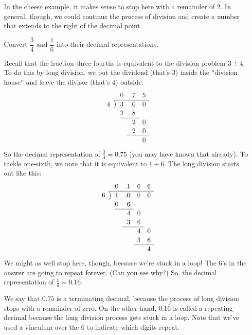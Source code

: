 In the cheese example, it makes sense to stop here with a remainder of 2. In general, though, we could continue the process of division and create a number that extends to the right of the decimal point.

\begin{boxedex}
Convert $\dfrac{3}{4}$ and $\dfrac{1}{6}$ into their decimal representations.

\bigskip{} Recall that the fraction three-fourths is equivalent to the division problem $3 \div 4$. To do this by long division, we put the dividend (that's 3) inside the ``division house'' and leave the divisor (that's 4) outside.
\[
\renewcommand\arraystretch{1.1}
\begin{array}{*1r @{\hskip\arraycolsep}c@{\hskip\arraycolsep} *3r}
	&&			0& .7	& 5 \\
\cline{2-5}
4	&\big)&	3	& .0	& 0 \\
	&&		2	&8		\\
\cline{3-4}
	&&			&2 & 0 \\
	&&			&2 & 0 \\
\cline{4-5}
	&&			&& 0 \\
\end{array}
\]
So the decimal representation of $\frac{3}{4} = 0.75$ (you may have known that already). To tackle one-sixth, we note that it is equivalent to $1 \div 6$. The long division starts out like this:
\[
\renewcommand\arraystretch{1.1}
\begin{array}{*1r @{\hskip\arraycolsep}c@{\hskip\arraycolsep} *4r}
	&&			0& .1	& 6	& 6 \\
\cline{2-6}
6	&\big)&	1	& .0	& 0	& 0 \\
	&&		0	&6		\\
\cline{3-4}
	&&			&4	& 0 \\
	&&			&3	& 6 \\
\cline{4-5}
	&&			&	& 4	& 0 \\
	&&			&	& 3	& 6 \\
\cline{5-6}
	&&			&	&	& 4
\end{array}
\]
We might as well stop here, though, because we're stuck in a loop! The 6's in the answer are going to repeat forever. (Can you see why?) So, the decimal representation of $\frac{1}{6} = 0.1\overline{6}$.
\end{boxedex}

We say that $0.75$ is a terminating decimal, because the process of long division stops with a remainder of zero. On the other hand, $0.1\overline{6}$ is called a repeating decimal because the long division process gets stuck in a loop. Note that we've used a vinculum over the 6 to indicate which digits repeat.

